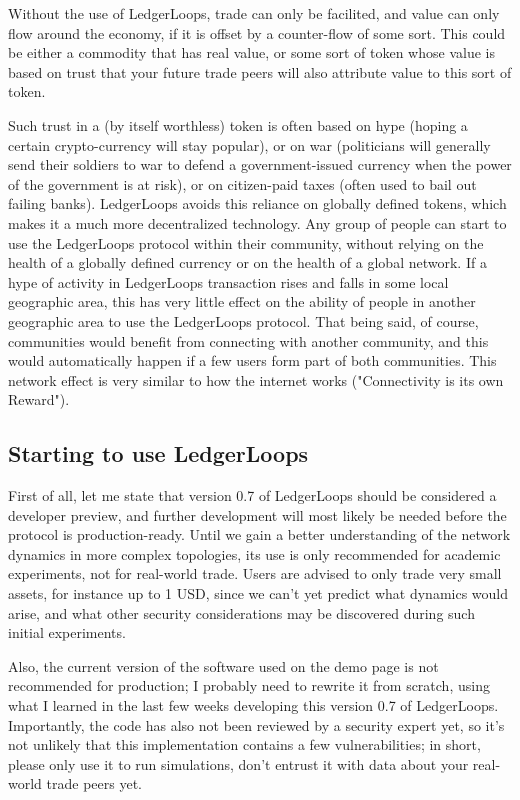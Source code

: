 \documentclass[11pt,twoside,a4paper]{article}
\begin{document}
Without the use of LedgerLoops, trade can only be facilited, and value can only flow around the economy, if it is offset by a counter-flow of some sort. This could be either a commodity that has real value, or some sort of token whose value is based on trust that your future trade peers will also attribute value to this sort of token.

Such trust in a (by itself worthless) token is often based on hype (hoping a certain crypto-currency will stay popular), or on war (politicians will generally send their soldiers to war to defend a government-issued currency when the power of the government is at risk), or on citizen-paid taxes (often used to bail out failing banks). LedgerLoops avoids this reliance on globally defined tokens, which makes it a much more decentralized technology. Any group of people can start to use the LedgerLoops protocol within their community, without relying on the health of a globally defined currency or on the health of a global network. If a hype of activity in LedgerLoops transaction rises and falls in some local geographic area, this has very little effect on the ability of people in another geographic area to use the LedgerLoops protocol. That being said, of course, communities would benefit from connecting with another community, and this would automatically happen if a few users form part of both communities. This network effect is very similar to how the internet works ("Connectivity is its own Reward").

\subsection{Starting to use LedgerLoops}
First of all, let me state that version 0.7 of LedgerLoops should be considered a developer preview, and further development will most likely be needed before the protocol is production-ready. Until we gain a better understanding of the network dynamics in more complex topologies, its use is only recommended for academic experiments, not for real-world trade. Users are advised to only trade very small assets, for instance up to 1 USD, since we can't yet predict what dynamics would arise, and what other security considerations may be discovered during such initial experiments.

Also, the current version of the software used on the demo page is not recommended for production; I probably need to rewrite it from scratch, using what I learned in the last few weeks developing this version 0.7 of LedgerLoops. Importantly, the code has also not been reviewed by a security expert yet, so it's not unlikely that this implementation contains a few vulnerabilities; in short, please only use it to run simulations, don't entrust it with data about your real-world trade peers yet.
\end{document}
